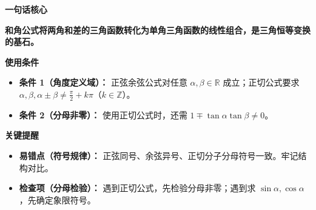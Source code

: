 \begin{summarybox}
	\textbf{\textcolor{CSummary}{一句话核心}}

	\textbf{和角公式将两角和差的三角函数转化为单角三角函数的线性组合，是三角恒等变换的基石。}

	\medskip
	\textbf{\textcolor{CSummary}{使用条件}}
	\begin{itemize}[leftmargin=*, itemsep=0.5em, topsep=0.4em]
		\item \textbf{条件 1（角度定义域）：} 正弦余弦公式对任意 $\alpha,\beta\in\mathbb{R}$ 成立；正切公式要求 $\alpha,\beta,\alpha\pm\beta\neq\frac{\pi}{2}+k\pi$（$k\in\mathbb{Z}$）。
		\item \textbf{条件 2（分母非零）：} 使用正切公式时，还需 $1\mp\tan\alpha\tan\beta\neq0$。
	\end{itemize}

	\medskip
	\textbf{\textcolor{CSummary}{关键提醒}}
	\begin{itemize}[leftmargin=*, itemsep=0.5em, topsep=0.4em]
		\item \textbf{易错点（符号规律）：} 正弦同号、余弦异号、正切分子分母符号一致。牢记结构对比。
		\item \textbf{检查项（分母检验）：} 遇到正切公式，先检验分母非零；遇到求 $\sin\alpha,\cos\alpha$，先确定象限符号。
	\end{itemize}
\end{summarybox}
